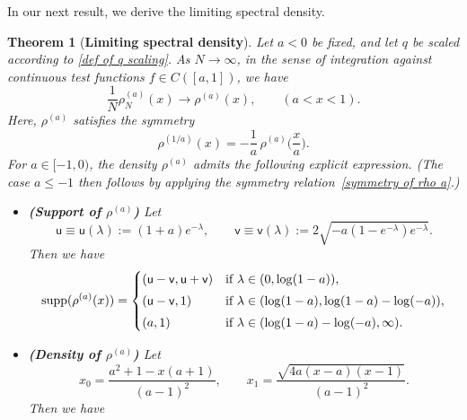 \documentclass{amsart}
\newcommand{\supp}{\operatorname{supp}}
\theoremstyle{plain}
\newtheorem{thm}{Theorem}[section]
\theoremstyle{remark}
\numberwithin{equation}{section}
\begin{document}
 
 

In our next result, we derive the limiting spectral density. 

\begin{thm}[\textbf{Limiting spectral density}] \label{Thm_limiting density}
Let $a < 0$ be fixed, and let $q$ be scaled according to \eqref{def of q scaling}.
As $N \to \infty$, in the sense of integration against continuous test functions $f \in C([a,1])$, we have 
\begin{equation}
\frac{1}{N}\rho^{ (a) }_N( x ) \to  \rho^{ (a) }( x ), \qquad (a<x<1).
\end{equation}
Here, $\rho^{(a)}$ satisfies the symmetry
\begin{equation} \label{symmetry of rho a}
\rho^{(1/a)}(x) = -\frac{1}{a}\, \rho^{(a)}\Big( \frac{x}{a} \Big).
\end{equation}
For $a \in [-1,0)$, the density $\rho^{(a)}$ admits the following explicit expression. (The case $a \le -1$ then follows by applying the symmetry relation~\eqref{symmetry of rho a}.)
\begin{itemize}
    \item \textup{\textbf{(Support of $\rho^{ (a) }$)}} 
    Let 
     \begin{equation} \label{def of u v(lambda) main}
    \mathsf{u} \equiv    \mathsf{u}(\lambda):= (1+a)e^{-\lambda} , \qquad \mathsf{v} \equiv  \mathsf{v}(\lambda):= 2\sqrt{-a(1-e^{-\lambda})e^{-\lambda}} .
    \end{equation} 
    Then we have    
    \begin{equation}\label{def of support}
    \supp( \rho^{(a)}(x) )= \begin{cases}
    (\mathsf{u}-\mathsf{v},\mathsf{u}+\mathsf{v} ) & \textup{if } \lambda \in (0, \log(1-a) ) , 
    \smallskip 
    \\ 
    (\mathsf{u}-\mathsf{v},1 ) &\textup{if }\lambda \in (\log(1-a),\log(1-a)-\log(-a) ) ,
    \smallskip 
    \\
    (a,1) & \textup{if }\lambda \in (\log(1-a)-\log(-a),\infty) .
    \end{cases}
    \end{equation}
     \item \textup{\textbf{(Density of $\rho^{ (a) }$)}} Let 
\begin{equation}\label{eqn:def of x0x1}
        x_{0}=\frac{a^{2}+1-x(a+1)}{(a-1)^{2}},\qquad x_{1}=\frac{\sqrt{4a(x-a)(x-1)}}{(a-1)^{2}} . 
    \end{equation}
   Then we have 
       \begin{align} \label{def of limiting density}

\end{align}
\end{itemize}
\end{thm}
\end{document}
